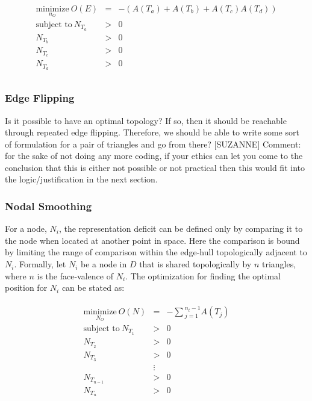 \documentclass[11pt]{article}
\begin{document}
\begin{eqnarray*}
\begin{array}{rcl}
\underset{n_O}{\text{minimize}} \ O(E) & = & -\left(A\left(T_a\right) + A\left(T_b\right) + A\left(T_c\right) A\left(T_d\right) \right) \\
\text{subject to} \ N_{T_a} & > & 0 \\
N_{T_b} & > & 0 \\ 
N_{T_c} & > & 0 \\
N_{T_d} & > & 0 \\
\end{array}
\end{eqnarray*}

\subsubsection{Edge Flipping}
Is it possible to have an optimal topology? If so, then it should be
reachable through repeated edge flipping. Therefore, we should be able
to write some sort of formulation for a pair of triangles and go from
there? [SUZANNE] Comment: for the sake of not doing any more coding, if
your ethics can let you come to the conclusion that this is either not
possible or not practical then this would fit into the
logic/justification in the next section.

\subsubsection{Nodal Smoothing}
For a node, $N_i$, the representation deficit can be defined only by
comparing it to the node when located at another point in space. Here
the comparison is bound by limiting the range of comparison within the
edge-hull topologically adjacent to $N_i$. Formally, let $N_i$ be a node
in $D$ that is shared topologically by $n$ triangles, where $n$ is the
face-valence of $N_i$. The optimization for finding the optimal position
for $N_i$ can be stated as:

\begin{eqnarray*}
\begin{array}{rcl}
\underset{N_O}{\text{minimize}} \ O(N) & = &
-\sum{_{j=1}^{n_t-1}A\left(T_j\right)} \\
\text{subject to} \ N_{T_1} & > & 0 \\
N_{T_2} & > & 0 \\ 
N_{T_3} & > & 0 \\
& \vdots & \\
N_{T_{n-1}} & > & 0 \\ 
N_{T_n} & > & 0
\end{array}
\end{eqnarray*}
\end{document}
